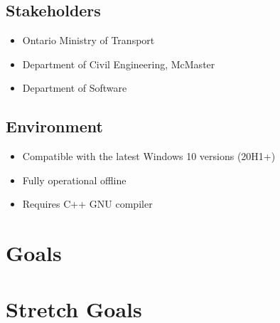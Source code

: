 \documentclass{article}
\begin{document}
\subsection{Stakeholders}

\begin{itemize}
  \item Ontario Ministry of Transport
  \item Department of Civil Engineering, McMaster
  \item Department of Software 
\end{itemize}
\subsection{Environment}
\begin{itemize}
  \item Compatible with the latest Windows 10 versions (20H1+)
  \item Fully operational offline 
  \item Requires C++ GNU compiler 
\end{itemize}

\section{Goals}

\section{Stretch Goals}
\end{document}
